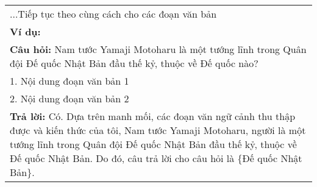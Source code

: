 \begin{table}[ht]
{\begin{tabular}{p{}}
            \hspace{1cm}...Tiếp tục theo cùng cách cho các đoạn văn bản                                                                                                                                                                                                                                                                                                                                  \\
            \textbf{Ví dụ:}                                                                                                                                                                                                                                                                                                                                                                              \\
            \textbf{Câu hỏi:} Nam tước Yamaji Motoharu là một tướng lĩnh trong Quân đội Đế quốc Nhật Bản đầu thế kỷ, thuộc về Đế quốc nào?                                                                                                                                                                                                                                                               \\
            \hspace{1cm}1. Nội dung đoạn văn bản 1                                                                                                                                                                                                                                                                                                                                                       \\
            \hspace{1cm}2. Nội dung đoạn văn bản 2                                                                                                                                                                                                                                                                                                                                                       \\
            \textbf{Trả lời:} Có. Dựa trên manh mối, các đoạn văn ngữ cảnh thu thập được và kiến thức của tôi, Nam tước Yamaji Motoharu, người là một tướng lĩnh trong Quân đội Đế quốc Nhật Bản đầu thế kỷ, thuộc về Đế quốc Nhật Bản. Do đó, câu trả lời cho câu hỏi là \{Đế quốc Nhật Bản\}.                                                                                                          \\
            \bottomrule
        \end{tabular}}
\end{table}

